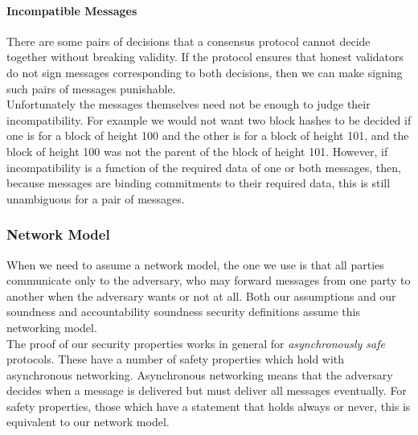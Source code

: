 \paragraph{Incompatible Messages}
\noindent There are some pairs of decisions that a consensus protocol cannot decide together without breaking validity. 
If the protocol ensures that honest validators do not sign messages corresponding 
to both decisions, then we can make signing such pairs of messages punishable. \\

\noindent Unfortunately the messages themselves need not be enough to judge their incompatibility. 
For example we would not want two block hashes to be decided if one is for a block of height 100 and the other is for a block of height 101, 
and the block of height 100 was not the parent of the block of height 101. However, if incompatibility is a function of the required data of one or both messages, 
then, because messages are binding commitments to their required data, this is still unambiguous for a pair of messages.

\subsubsection{Network Model}

\noindent When we need to assume a network model, the one we use is that all parties communicate only to the adversary, who may forward messages from one party to 
another when the adversary wants or not at all. Both our assumptions and our soundness and accountability soundness security definitions assume this networking model. \\

\noindent The proof of our security properties works in general for {\it asynchronously safe} protocols. These have a number of safety properties which hold with asynchronous networking. 
Asynchronous networking means that the adversary decides when a message is delivered but must deliver all messages eventually. For safety properties, those which have a 
statement that holds always or never, this is equivalent to our network model.

